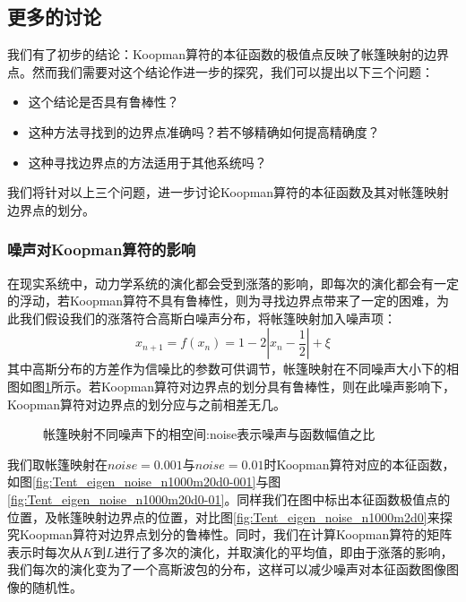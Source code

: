 \subsection{更多的讨论}
我们有了初步的结论：Koopman算符的本征函数的极值点反映了帐篷映射的边界点。然而我们需要对这个结论作进一步的探究，我们可以提出以下三个问题：
\begin{itemize}
\item 这个结论是否具有鲁棒性？
\item 这种方法寻找到的边界点准确吗？若不够精确如何提高精确度？
\item 这种寻找边界点的方法适用于其他系统吗？
\end{itemize}
我们将针对以上三个问题，进一步讨论Koopman算符的本征函数及其对帐篷映射边界点的划分。

\subsubsection{噪声对Koopman算符的影响}
在现实系统中，动力学系统的演化都会受到涨落的影响，即每次的演化都会有一定的浮动，若Koopman算符不具有鲁棒性，则为寻找边界点带来了一定的困难，为此我们假设我们的涨落符合高斯白噪声分布，将帐篷映射加入噪声项：
\begin{equation}
  x_{n+1}=f(x_n)=1-2|x_n-\frac{1}{2}|+\xi
\end{equation}
其中高斯分布的方差作为信噪比的参数可供调节，帐篷映射在不同噪声大小下的相图如图\ref{fig:Tent_noise_phase_d0}所示。若Koopman算符对边界点的划分具有鲁棒性，则在此噪声影响下，Koopman算符对边界点的划分应与之前相差无几。

\begin{figure}[!]
  \centering
  \caption[帐篷映射不同噪声下的相空间]{帐篷映射不同噪声下的相空间:noise表示噪声与函数幅值之比}
  \label{fig:Tent_noise_phase_d0}
\end{figure}

我们取帐篷映射在$noise=0.001$与$noise=0.01$时Koopman算符对应的本征函数，如图\ref{fig:Tent_eigen_noise_n1000m20d0-001}与图\ref{fig:Tent_eigen_noise_n1000m20d0-01}。同样我们在图中标出本征函数极值点的位置，及帐篷映射边界点的位置，对比图\ref{fig:Tent_eigen_noise_n1000m2d0}来探究Koopman算符对边界点划分的鲁棒性。同时，我们在计算Koopman算符的矩阵表示时每次从$K$到$L$进行了多次的演化，并取演化的平均值，即由于涨落的影响，我们每次的演化变为了一个高斯波包的分布，这样可以减少噪声对本征函数图像图像的随机性。

